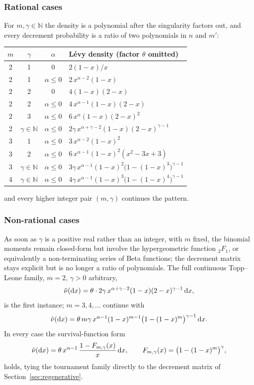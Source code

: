 \documentclass[11pt]{article}
\newcommand{\NN}{\mathbb{N}}
\theoremstyle{plain}
\theoremstyle{definition}
\begin{document}
\subsubsection{Rational cases} For \(m,\gamma\in\NN\) the density is a polynomial after the singularity factors out, and every decrement probability is a ratio of two polynomials in \(n\) and \(m'\):
\begin{center}
\begin{tabular}{@{}cccl@{}}
\toprule
\(m\) & \(\gamma\) & \(\alpha\) & Lévy density (factor \(\theta\) omitted) \\
\midrule
2 & 1 & \(0\) & \(2(1-x)/x\) \\
2 & 1 & \(\alpha\le0\) & \(2\,x^{\alpha-2}(1-x)\) \\
2 & 2 & \(0\) & \(4(1-x)(2-x)\) \\
2 & 2 & \(\alpha\le0\) & \(4\,x^{\alpha-1}(1-x)(2-x)\) \\
2 & 3 & \(\alpha\le0\) & \(6\,x^{\alpha}(1-x)(2-x)^2\) \\
2 & \(\gamma\in\NN\) & \(\alpha\le0\) & \(2\gamma\,x^{\alpha+\gamma-2}(1-x)(2-x)^{\gamma-1}\) \\
3 & 1 & \(\alpha\le0\) & \(3\,x^{\alpha-2}(1-x)^2\) \\
3 & 2 & \(\alpha\le0\) & \(6\,x^{\alpha-1}(1-x)^2(x^2-3x+3)\) \\
3 & \(\gamma\in\NN\) & \(\alpha\le0\) & \(3\gamma\,x^{\alpha-1}(1-x)^2\bigl(1-(1-x)^3\bigr)^{\gamma-1}\) \\
4 & \(\gamma\in\NN\) & \(\alpha\le0\) & \(4\gamma\,x^{\alpha-1}(1-x)^3\bigl(1-(1-x)^4\bigr)^{\gamma-1}\) \\
\bottomrule
\end{tabular}
\end{center}
and every higher integer pair \((m,\gamma)\) continues the pattern.

\subsubsection{Non-rational cases} As soon as \(\gamma\) is a positive real rather than an integer, with \(m\) fixed, the binomial moments remain closed-form but involve the hypergeometric function \({}_2F_1\), or equivalently a non-terminating series of Beta functions; the decrement matrix stays explicit but is no longer a ratio of polynomials. The full continuous Topp--Leone family, \(m=2\), \(\gamma>0\) arbitrary,
\[
\tilde\nu({\rm d}x)=\theta\cdot2\gamma\,x^{\alpha+\gamma-2}(1-x)(2-x)^{\gamma-1}\,{\rm d}x,
\]
is the first instance; \(m=3,4,\dots\) continue with
\[
\tilde\nu({\rm d}x)=\theta\,m\gamma\,x^{\alpha-1}(1-x)^{m-1}\bigl(1-(1-x)^m\bigr)^{\gamma-1}\,{\rm d}x.
\]
In every case the survival-function form
\[
\tilde\nu({\rm d}x)=\theta\,x^{\alpha-1}\,\frac{1-F_{m,\gamma}(x)}x\,{\rm d}x,\qquad F_{m,\gamma}(x)=\bigl(1-(1-x)^m\bigr)^\gamma,
\]
holds, tying the tournament family directly to the  decrement matrix of Section~\ref{sec:regenerative}.
\end{document}
